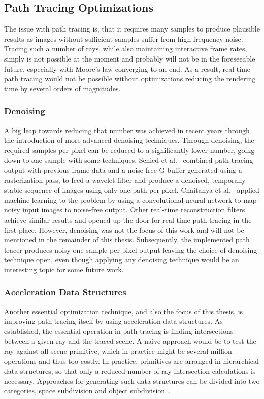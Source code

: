 \subsection{Path Tracing Optimizations}
The issue with path tracing is, that it requires many samples to produce plausible results as images without sufficient samples suffer from high-frequency noise. Tracing such a number of rays, while also maintaining interactive frame rates, simply is not possible at the moment and probably will not be in the foreseeable future, especially with Moore's law converging to an end. As a result, real-time path tracing would not be possible without optimizations reducing the rendering time by several orders of magnitudes. 
\subsubsection{Denoising}
A big leap towards reducing that number was achieved in recent years through the introduction of more advanced denoising techniques. Through denoising, the required samples-per-pixel can be reduced to a significantly lower number, going down to one sample with some techniques. Schied et al.~\cite{schied_spatiotemporal_2017} combined path tracing output with previous frame data and a noise free G-buffer generated using a rasterization pass, to feed a wavelet filter and produce a denoised, temporally stable sequence of images using only one path-per-pixel. Chaitanya et al.~\cite{chaitanya_interactive_2017} applied machine learning to the problem by using a convolutional neural network to map noisy input images to noise-free output. Other real-time reconstruction filters\cite{mara17towards,koskela2019bmfr} achieve similar results and opened up the door for real-time path tracing in the first place. However, denoising was not the focus of this work and will not be mentioned in the remainder of this thesis. Subsequently, the implemented path tracer produces noisy one sample-per-pixel output leaving the choice of denoising technique open, even though applying any denoising technique would be an interesting topic for some future work.
\subsubsection{Acceleration Data Structures}
Another essential optimization technique, and also the focus of this thesis, is improving path tracing itself by using acceleration data structures. As established, the essential operation in path tracing is finding intersections between a given ray and the traced scene. A naive approach would be to test the ray against all scene primitive, which in practice might be several million operations and thus too costly. In practice, primitives are arranged in hierarchical data structures, so that only a reduced number of ray intersection calculations is necessary. Approaches for generating such data structures can be divided into two categories, space subdivision and object subdivision~\cite{macDonald1988space}.

